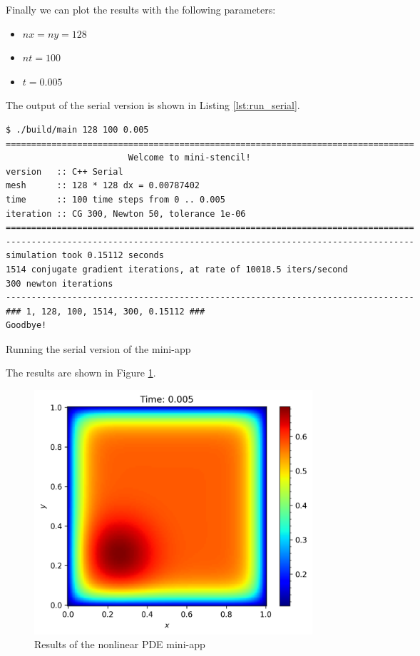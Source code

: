\documentclass[unicode,11pt,a4paper,oneside,numbers=endperiod,openany]{scrartcl}
\begin{document}
Finally we can plot the results with the following parameters:
\begin{itemize}
    \item $nx = ny = 128$
    \item $nt = 100$
    \item $t = 0.005$
\end{itemize}

The output of the serial version is shown in Listing \ref{lst:run_serial}.

\begin{listing}[h]
    \begin{verbatim}
$ ./build/main 128 100 0.005
================================================================================
                        Welcome to mini-stencil!
version   :: C++ Serial
mesh      :: 128 * 128 dx = 0.00787402
time      :: 100 time steps from 0 .. 0.005
iteration :: CG 300, Newton 50, tolerance 1e-06
================================================================================
--------------------------------------------------------------------------------
simulation took 0.15112 seconds
1514 conjugate gradient iterations, at rate of 10018.5 iters/second
300 newton iterations
--------------------------------------------------------------------------------
### 1, 128, 100, 1514, 300, 0.15112 ###
Goodbye!
    \end{verbatim}
    \caption{Running the serial version of the mini-app}
    \label{lst:run_serial}
\end{listing}

The results are shown in Figure \ref{fig:output_serial}.

\begin{figure}[h!t]
    \centering
    \includegraphics[width=0.5\textwidth]{plots/output_serial.png}
    \caption{Results of the nonlinear PDE mini-app}
    \label{fig:output_serial}
\end{figure}
\end{document}
